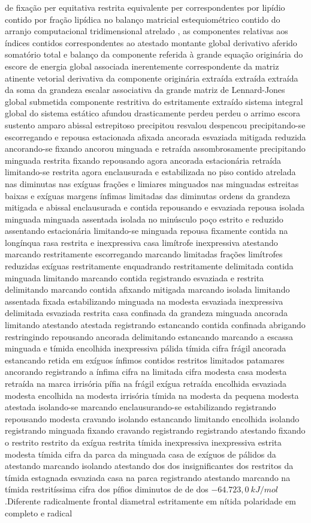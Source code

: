 de fixação per equitativa restrita equivalente per correspondentes por lipídio contido por fração lipídica no balanço matricial estequiométrico contido do arranjo computacional tridimensional atrelado , as componentes relativas aos índices contidos correspondentes ao atestado montante global derivativo aferido somatório total e balanço da componente referida à grande equação originária do escore de energia global associada inerentemente correspondente da matriz atinente vetorial derivativa da componente originária extraída extraída extraída da soma da grandeza escalar associativa da grande matriz de Lennard-Jones global submetida componente restritiva do estritamente extraído sistema integral global do sistema estático afundou drasticamente perdeu perdeu o arrimo escora sustento amparo abissal estrepitoso precipitou resvalou despencou precipitando-se escorregando e repousa estacionada afixada ancorada esvaziada mitigada reduzida ancorando-se fixando ancorou minguada e retraída assombrosamente precipitando minguada restrita fixando repousando agora ancorada estacionária retraída limitando-se restrita agora enclausurada e estabilizada no piso contido atrelada nas diminutas nas exíguas frações e limiares minguados nas minguadas estreitas baixas e exíguas margens ínfimas limitadas das diminutas ordens da grandeza mitigada e abissal enclausurada e contida repousando e esvaziada repousa isolada minguada minguada assentada isolada no minúsculo poço estrito e reduzido assentando estacionária limitando-se minguada repousa fixamente contida na longínqua rasa restrita e inexpressiva casa limítrofe inexpressiva atestando marcando restritamente escorregando marcando limitadas frações limítrofes reduzidas exíguas restritamente enquadrando restritamente delimitada contida minguada limitando marcando contida registrando esvaziada e restrita delimitando marcando contida afixando mitigada marcando isolada limitando assentada fixada estabilizando minguada na modesta esvaziada inexpressiva delimitada esvaziada restrita casa confinada da grandeza minguada ancorada limitando atestando atestada registrando estancando contida confinada abrigando restringindo repousando ancorada delimitando estancando marcando a escassa minguada e tímida encolhida inexpressiva pálida tímida cifra frágil ancorada estancando retida em exíguos ínfimos contidos restritos limitados patamares ancorando registrando a ínfima cifra na limitada cifra modesta casa modesta retraída na marca irrisória pífia na frágil exígua retraída encolhida esvaziada modesta encolhida na modesta irrisória tímida na modesta da pequena modesta atestada isolando-se marcando enclausurando-se estabilizando registrando repousando modesta cravando isolando estancando limitando encolhida isolando registrando minguada fixando cravando registrando registrando atestando fixando o restrito restrito da exígua restrita tímida inexpressiva inexpressiva estrita modesta tímida cifra da parca da minguada casa de exíguos de pálidos da atestando marcando isolando atestando dos dos insignificantes dos restritos da tímida estagnada esvaziada casa na parca registrando atestando marcando na tímida restritíssima cifra dos pífios diminutos de de dos $-64.723,0~kJ/mol$.Diferente radicalmente frontal diametral estritamente em nítida polaridade em completo e radical 